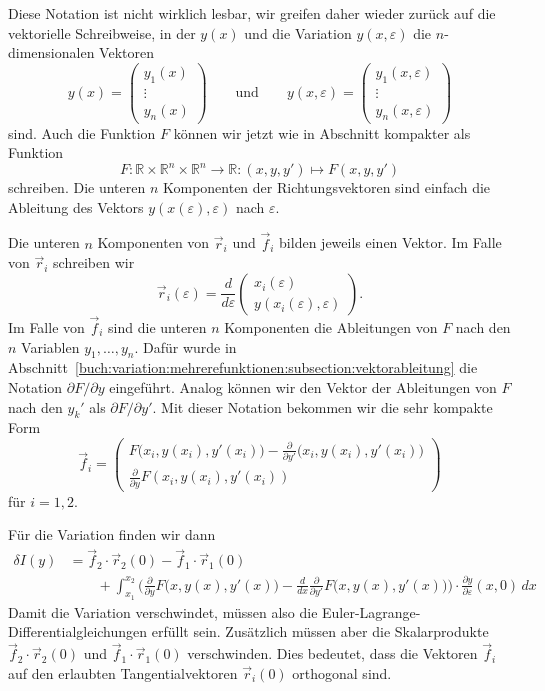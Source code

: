 Diese Notation ist nicht wirklich lesbar, wir greifen daher wieder
zurück auf die vektorielle Schreibweise, in der 
$y(x)$ und die Variation $y(x,\varepsilon)$ die $n$-dimensionalen
Vektoren
\[
y(x)
=
\begin{pmatrix}
y_1(x)\\
\vdots\\
y_n(x)
\end{pmatrix}
\qquad
\text{und}
\qquad
y(x,\varepsilon)
=
\begin{pmatrix}
y_1(x,\varepsilon)\\
\vdots\\
y_n(x,\varepsilon)
\end{pmatrix}
\]
sind.
Auch die Funktion $F$ können wir jetzt wie in Abschnitt
kompakter als
Funktion
\[
F\colon
\mathbb{R}\times \mathbb{R}^n\times\mathbb{R}^n
\to
\mathbb{R}
:
(x,y,y')
\mapsto
F(x,y,y')
\]
schreiben.
Die unteren $n$ Komponenten der Richtungsvektoren sind einfach
die Ableitung des Vektors
$y(x(\varepsilon),\varepsilon)$ nach $\varepsilon$.

Die unteren $n$ Komponenten von $\vec{r}_i$ und $\vec{f}_i$ bilden jeweils
einen Vektor.
Im Falle von $\vec{r}_i$ schreiben wir
\[
\vec{r}_i(\varepsilon)
=
\frac{d}{d\varepsilon}
\begin{pmatrix}
x_i(\varepsilon)\\
y(x_i(\varepsilon),\varepsilon)
\end{pmatrix}.
\]
Im Falle von $\vec{f}_i$ sind die unteren $n$ Komponenten
die Ableitungen von $F$ nach den $n$ Variablen $y_1,\dots,y_n$.
Dafür wurde in
Abschnitt~\ref{buch:variation:mehrerefunktionen:subsection:vektorableitung}
die Notation $\partial F/\partial y$ eingeführt.
Analog können wir den Vektor der Ableitungen von $F$ nach den
$y_k'$ als $\partial F/\partial y'$.
Mit dieser Notation bekommen wir die sehr kompakte Form
\[
\vec{f}_i
=
\begin{pmatrix}
\displaystyle
F\bigl(x_i,y(x_i),y'(x_i)\bigr)
-
\frac{\partial}{\partial y'}\bigl(x_i,y(x_i),y'(x_i)\bigr)
\\[5pt]
\displaystyle
\frac{\partial}{\partial y} F(x_i,y(x_i),y'(x_i))
\end{pmatrix}
\]
für $i=1,2$.

Für die Variation finden wir dann
\begin{align*}
\delta I(y)
&=
\vec{f}_2\cdot \vec{r}_2(0)
-
\vec{f}_1\cdot \vec{r}_1(0)
\\
&\qquad
+
\int_{x_1}^{x_2}
\biggl(
\frac{\partial}{\partial y}F\bigl(x,y(x),y'(x)\bigr)
-
\frac{d}{dx}
\frac{\partial}{\partial y'}F\bigl(x,y(x),y'(x)\bigr)
\biggr)
\cdot
\frac{\partial y}{\partial\varepsilon}(x,0)
\,dx
\end{align*}
Damit die Variation verschwindet, müssen also die
Euler-Lagrange-Differential\-glei\-chun\-gen erfüllt sein.
Zusätzlich müssen aber die Skalarprodukte
$\vec{f}_2\cdot \vec{r}_2(0)$
und
$\vec{f}_1\cdot \vec{r}_1(0)$
verschwinden.
Dies bedeutet, dass die Vektoren $\vec{f}_i$ auf den erlaubten
Tangentialvektoren $\vec{r}_i(0)$ orthogonal sind.





